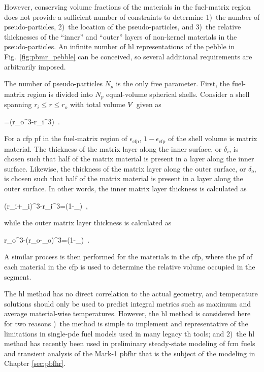 However, conserving volume fractions of the materials in the fuel-matrix region does not provide a sufficient number of constraints to determine 1)~the number of pseudo-particles, 2)~the location of the pseudo-particles, and 3)~the relative thicknesses of the ``inner'' and ``outer'' layers of non-kernel materials in the pseudo-particles. An infinite number of \gls{hl} representations of the pebble in Fig.\ \ref{fig:pbmr_pebble} can be conceived, so several additional requirements are arbitrarily imposed. 

The number of pseudo-particles \(N_p\) is the only free parameter. First, the fuel-matrix region is divided into \(N_p\) equal-volume spherical shells. Consider a shell spanning \(r_i\leq r\leq r_o\) with total volume \(\volume\) given as

\beq
\volume=\pi\left(r_o^3-r_i^3\right)\ .
\eeq

\noindent For a \gls{cfp} \gls{pf} in the fuel-matrix region of \(\epsilon_\text{cfp}\), \(1-\epsilon_\text{cfp}\) of the shell volume is matrix material. The thickness of the matrix layer along the inner surface, or \(\delta_i\), is chosen such that half of the matrix material is present in a layer along the inner surface. Likewise, the thickness of the matrix layer along the outer surface, or \(\delta_o\), is chosen such that half of the matrix material is present in a layer along the outer surface. In other words, the inner matrix layer thickness is calculated as

\beq
{}\pi\left\lbrack\left(r_i+\delta_i\right)^3-r_i^3\right\rbrack=\left(1-\epsilon_\right)\volume\ ,
\eeq

\noindent while the outer matrix layer thickness is calculated as

\beq
{}\pi\left\lbrack r_o^3-\left(r_o-\delta_o\right)^3\right\rbrack=\left(1-\epsilon_\right)\volume\ .
\eeq

\noindent A similar process is then performed for the materials in the \gls{cfp}, where the \gls{pf} of each material in the \gls{cfp} is used to determine the relative volume occupied in the segment.

The \gls{hl} method has no direct correlation to the actual geometry, and temperature solutions should only be used to predict integral metrics such as maximum and average material-wise temperatures. However, the \gls{hl} method is considered here for two reasons )~the method is simple to implement and representative of the limitations in single-\gls{pde} fuel models used in many legacy \gls{th} tools; and 2)~the \gls{hl} method has recently been used in preliminary steady-state modeling of \gls{fcm} fuels \cite{brown_fcm} and transient analysis of the Mark-1 \gls{pbfhr} \cite{xin_wang_thesis} that is the subject of the modeling in Chapter \ref{sec:pbfhr}.

